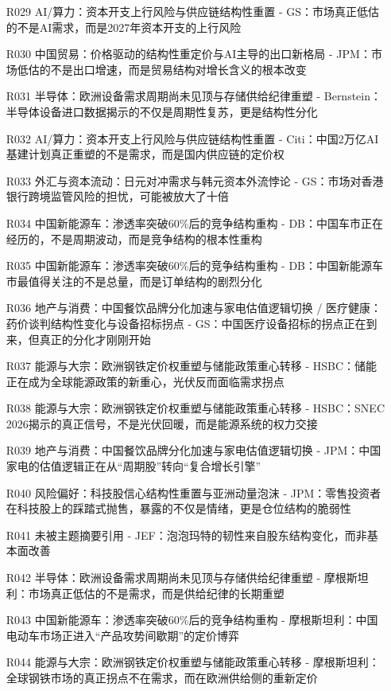 \documentclass[11pt]{ctexart}
\begin{document}
\begin{itemize}
  \item [R029] AI/算力：资本开支上行风险与供应链结构性重置 - GS：市场真正低估的不是AI需求，而是2027年资本开支的上行风险
  \item [R030] 中国贸易：价格驱动的结构性重定价与AI主导的出口新格局 - JPM：市场低估的不是出口增速，而是贸易结构对增长含义的根本改变
  \item [R031] 半导体：欧洲设备需求周期尚未见顶与存储供给纪律重塑 - Bernstein：半导体设备进口数据揭示的不仅是周期性复苏，更是结构性分化
  \item [R032] AI/算力：资本开支上行风险与供应链结构性重置 - Citi：中国2万亿AI基建计划真正重塑的不是需求，而是国内供应链的定价权
  \item [R033] 外汇与资本流动：日元对冲需求与韩元资本外流悖论 - GS：市场对香港银行跨境监管风险的担忧，可能被放大了十倍
  \item [R034] 中国新能源车：渗透率突破60\%后的竞争结构重构 - DB：中国车市正在经历的，不是周期波动，而是竞争结构的根本性重构
  \item [R035] 中国新能源车：渗透率突破60\%后的竞争结构重构 - DB：中国新能源车市最值得关注的不是总量，而是订单结构的剧烈分化
  \item [R036] 地产与消费：中国餐饮品牌分化加速与家电估值逻辑切换 / 医疗健康：药价谈判结构性变化与设备招标拐点 - GS：中国医疗设备招标的拐点正在到来，但真正的分化才刚刚开始
  \item [R037] 能源与大宗：欧洲钢铁定价权重塑与储能政策重心转移 - HSBC：储能正在成为全球能源政策的新重心，光伏反而面临需求拐点
  \item [R038] 能源与大宗：欧洲钢铁定价权重塑与储能政策重心转移 - HSBC：SNEC 2026揭示的真正信号，不是光伏回暖，而是能源系统的权力交接
  \item [R039] 地产与消费：中国餐饮品牌分化加速与家电估值逻辑切换 - JPM：中国家电的估值逻辑正在从“周期股”转向“复合增长引擎”
  \item [R040] 风险偏好：科技股信心结构性重置与亚洲动量泡沫 - JPM：零售投资者在科技股上的踩踏式抛售，暴露的不仅是情绪，更是仓位结构的脆弱性
  \item [R041] 未被主题摘要引用 - JEF：泡泡玛特的韧性来自股东结构变化，而非基本面改善
  \item [R042] 半导体：欧洲设备需求周期尚未见顶与存储供给纪律重塑 - 摩根斯坦利：市场真正低估的不是需求，而是供给纪律的长期重塑
  \item [R043] 中国新能源车：渗透率突破60\%后的竞争结构重构 - 摩根斯坦利：中国电动车市场正进入“产品攻势间歇期”的定价博弈
  \item [R044] 能源与大宗：欧洲钢铁定价权重塑与储能政策重心转移 - 摩根斯坦利：全球钢铁市场的真正拐点不在需求，而在欧洲供给侧的重新定价

\end{itemize}
\end{document}
